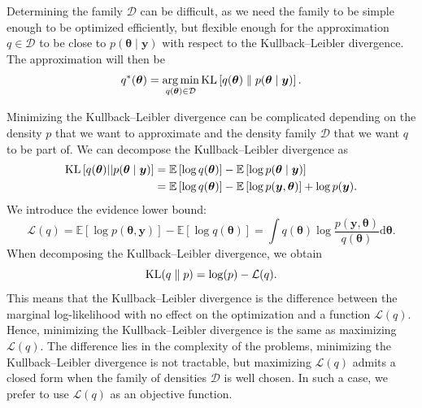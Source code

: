 \documentclass[a4paper, 11pt]{report}
\numberwithin{equation}{chapter}
\DeclareMathOperator*{\argmin}{arg\,min}
\DeclareMathOperator*{\KL}{{\rm KL}}
\begin{document}
Determining the family $\mathcal{D}$ can be difficult, as we need the family to be simple enough to be optimized efficiently, but flexible enough for the approximation $q \in \mathcal{D}$ to be close to $p(\boldsymbol{\theta} \mid \boldsymbol{y})$ with respect to the Kullback--Leibler divergence. The approximation will then be
\begin{equation*}
q^*(\boldsymbol{\theta} ) = \argmin_{q(\boldsymbol{\theta}) \in \mathcal{D}} \KL\left[ q(\boldsymbol{\theta}) \parallel p(\boldsymbol{\theta} \mid \boldsymbol{y})\right].
\end{equation*}

Minimizing the Kullback--Leibler divergence can be complicated depending on the density $p$ that we want to approximate and the density family $\mathcal{D}$ that we want $q$ to be part of. We can decompose the Kullback--Leibler divergence as
\begin{align*}
\KL\left[q(\boldsymbol{\theta})||p(\boldsymbol{\theta}\mid \boldsymbol{y})\right] &= \mathbb{E}\left[\log q(\boldsymbol{\theta})\right] - \mathbb{E}\left[\log p(\boldsymbol{\theta}\mid \boldsymbol{y})\right]\\
&= \mathbb{E}\left[\log q(\boldsymbol{\theta})\right] - \mathbb{E}\left[\log p(\boldsymbol{y},\boldsymbol{\theta})\right] + \log p(\boldsymbol{y}).
\end{align*}
We introduce the evidence lower bound:
\begin{equation*}
\mathcal{L}(q) = \mathbb{E}\left[\log p(\boldsymbol{\theta},\boldsymbol{y})\right] - \mathbb{E}\left[\log q(\boldsymbol{\theta})\right]
=\int q(\boldsymbol{\theta})\log\frac{p(\boldsymbol{y},\boldsymbol{\theta})}{q(\boldsymbol{\theta})}\mathrm{d}\boldsymbol{\theta}.
\end{equation*}
When decomposing the Kullback--Leibler divergence, we obtain
\begin{equation*}
\KL(q\parallel p) = \log(p) - \mathcal{L}(q).
\end{equation*}
This means that the Kullback--Leibler divergence is the difference between the marginal log-likelihood with no effect on the optimization and a function $\mathcal{L}(q)$. Hence, minimizing the Kullback--Leibler divergence is the same as maximizing $\mathcal{L}(q)$. The difference lies in the complexity of the problems, minimizing the Kullback--Leibler divergence is not tractable, but maximizing $\mathcal{L}(q)$ admits a closed form when the family of densities $\mathcal{D}$ is well chosen. In such a case, we prefer to use $\mathcal{L}(q)$ as an objective function.
\end{document}
